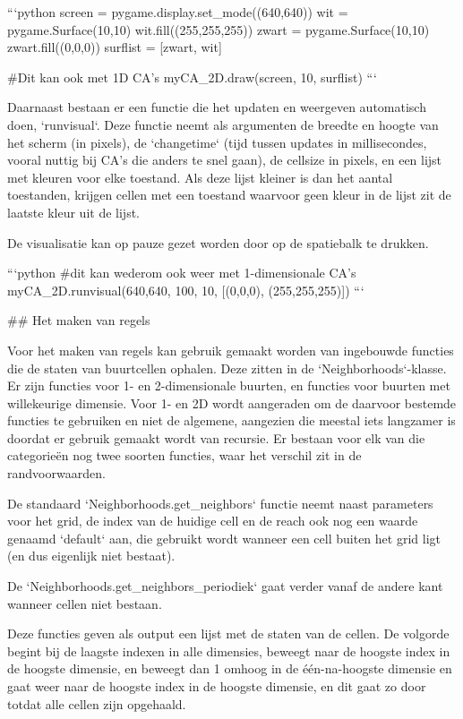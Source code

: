 \documentclass{article}
\begin{document}
\begin{markdown}
```python
screen = pygame.display.set_mode((640,640))
wit = pygame.Surface(10,10)
wit.fill((255,255,255))
zwart = pygame.Surface(10,10)
zwart.fill((0,0,0))
surflist = [zwart, wit]

#Dit kan ook met 1D CA's
myCA_2D.draw(screen, 10, surflist)
```

Daarnaast bestaan er een functie die het updaten en weergeven automatisch doen, `runvisual`. Deze functie neemt als argumenten de breedte en hoogte van het scherm (in pixels), de `changetime` (tijd tussen updates in millisecondes, vooral nuttig bij CA's die anders te snel gaan), de cellsize in pixels, en een lijst met kleuren voor elke toestand. Als deze lijst kleiner is dan het aantal toestanden, krijgen cellen met een toestand waarvoor geen kleur in de lijst zit de laatste kleur uit de lijst. 

De visualisatie kan op pauze gezet worden door op de spatiebalk te drukken.

```python
#dit kan wederom ook weer met 1-dimensionale CA's
myCA_2D.runvisual(640,640, 100, 10, [(0,0,0), (255,255,255)])
```

## Het maken van regels

Voor het maken van regels kan gebruik gemaakt worden van ingebouwde functies die de staten van buurtcellen ophalen. Deze zitten in de `Neighborhoods`-klasse. Er zijn functies voor 1- en 2-dimensionale buurten, en functies voor buurten met willekeurige dimensie. Voor 1- en 2D wordt aangeraden om de daarvoor bestemde functies te gebruiken en niet de algemene, aangezien die meestal iets langzamer is doordat er gebruik gemaakt wordt van recursie. Er bestaan voor elk van die categorieën nog twee soorten functies, waar het verschil zit in de randvoorwaarden. 

De standaard `Neighborhoods.get_neighbors` functie neemt naast parameters voor het grid, de index van de huidige cell en de reach ook nog een waarde genaamd `default` aan, die gebruikt wordt wanneer een cell buiten het grid ligt (en dus eigenlijk niet bestaat). 

De `Neighborhoods.get_neighbors_periodiek` gaat verder vanaf de andere kant wanneer cellen niet bestaan.

Deze functies geven als output een lijst met de staten van de cellen. De volgorde begint bij de laagste indexen in alle dimensies, beweegt naar de hoogste index in de hoogste dimensie, en beweegt dan 1 omhoog in de één-na-hoogste dimensie en gaat weer naar de hoogste index in de hoogste dimensie, en dit gaat zo door totdat alle cellen zijn opgehaald.


\end{markdown}
\end{document}
